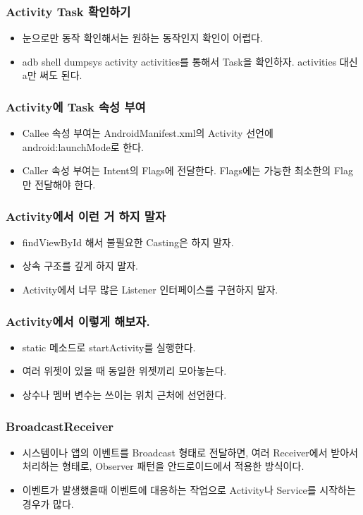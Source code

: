 \documentclass{beamer}
\begin{document}
\begin{frame}
\frametitle{Activity Task 확인하기}
\begin{itemize}
\item 눈으로만 동작 확인해서는 원하는 동작인지 확인이 어렵다.
\item adb shell dumpsys activity activities를 통해서 Task을 확인하자. activities 대신 a만 써도 된다.
\end{itemize}
\end{frame}

\begin{frame}
\frametitle{Activity에 Task 속성 부여}
\begin{itemize}
\item Callee 속성 부여는 AndroidManifest.xml의 Activity 선언에 android:launchMode로 한다.
\item Caller 속성 부여는 Intent의 Flags에 전달한다. Flags에는 가능한 최소한의 Flag만 전달해야 한다.
\end{itemize}
\end{frame}


\begin{frame}
\frametitle{Activity에서 이런 거 하지 말자}
\begin{itemize}
\item findViewById 해서 불필요한 Casting은 하지 말자. 
\item 상속 구조를 깊게 하지 말자.
\item Activity에서 너무 많은 Listener 인터페이스를 구현하지 말자.
\end{itemize}
\end{frame}

\begin{frame}
\frametitle{Activity에서 이렇게 해보자.}
\begin{itemize}
\item static 메소드로 startActivity를 실행한다.
\item 여러 위젯이 있을 때 동일한 위젯끼리 모아놓는다.
\item 상수나 멤버 변수는 쓰이는 위치 근처에 선언한다.
\end{itemize}
\end{frame}

\begin{frame}
\frametitle{BroadcastReceiver}
\begin{itemize}
\item 시스템이나 앱의 이벤트를 Broadcast 형태로 전달하면, 여러 Receiver에서 받아서 처리하는 형태로, Observer 패턴을 안드로이드에서 적용한 방식이다.
\item 이벤트가 발생했을때 이벤트에 대응하는 작업으로 Activity나 Service를 시작하는 경우가 많다.
\end{itemize}
\end{frame}
\end{document}
